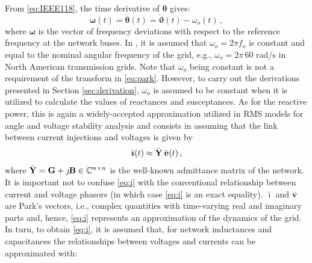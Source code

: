 \documentclass[journal, twocolumn, letter]{IEEEtran}
\newcommand{\bfg}[1]{\boldsymbol{#1}}
\newcommand{\bfp}[1]{\bar{\boldsymbol{#1}}}
\newcommand{\bfb}[1]{\boldsymbol{\rm #1}}
\newcommand{\Dt}{\dot}
\newcommand{\wo}{\omega_o}
\newcommand{\ii}{\imath}
\newcommand{\jj}{\jmath}
\newcommand{\ivec}{\bfp \ii}
\newcommand{\vvec}{\bfp v}
\newcommand{\wvec}{\bfg \omega}
\newcommand{\tvec}{\bfg \theta}
\newcommand{\Bbus}{\bfb B}
\newcommand{\Gbus}{\bfb G}
\newcommand{\Ybus}{\bar{\bfb Y}}
\begin{document}
From \eqref{eq:IEEE118}, the time derivative of $\tvec$ gives:
\begin{equation}
  \label{eq:w}
  \wvec(t) = \Dt {\tvec}(t) = \Dt {\bfg \vartheta}(t) - \wo(t) \, ,
\end{equation}
where $\wvec$ is the vector of frequency deviations with respect to
the reference frequency at the network buses.
In \cite{IEEE118}, it is assumed that $\wo = 2\pi f_o$ is constant and
equal to the nominal angular frequency of the grid, e.g.,
$\wo = 2\pi \, 60$ rad/s in North American transmission grids.
 Note that $\wo$ being constant is not a requirement of
the transform in \eqref{eq:park}.
However, to carry out the derivations presented in Section
\ref{sec:derivation}, $\wo$ is assumed to be constant when it is
utilized to calculate the values of reactances and susceptances.  As
for the reactive power, this is again a widely-accepted approximation
utilized in RMS models for angle and voltage stability analysis and
consists in  assuming that the link between current
injections and voltages is given by
\begin{equation}
  \label{eq:i}
  \ivec(t) \approx \Ybus \, \vvec(t) \, ,
\end{equation}
where $\Ybus = \Gbus + \jj \Bbus \in \mathbb{C}^{n \times n}$ is the
well-known admittance matrix of the network.  It is important not to
confuse \eqref{eq:i} with the conventional relationship between
current and voltage phasors (in which case \eqref{eq:i} is an exact
equality).  $\ivec$ and $\vvec$ are  Park's vectors, i.e.,
complex quantities with time-varying real and imaginary parts
 and, hence, \eqref{eq:i} represents an approximation of
the dynamics of the grid.  In turn, to obtain \eqref{eq:i}, it is
assumed that, for network inductances and capacitances the
relationships between voltages and currents can be approximated with:
\end{document}
